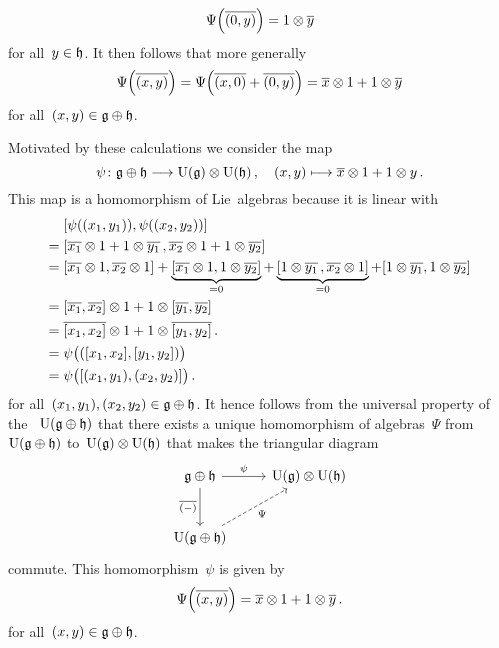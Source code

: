 \begin{example}
\begin{itemize}
      \[
        \Psi\Bigl( \overline{(0,y)} \Bigr)
        =
        1 \otimes \overline{y}
      \]
      for all~$y \in \mathfrak{h}$.
      It then follows that more generally
      \[
        \Psi\Bigl( \overline{(x,y)} \Bigr)
        =
        \Psi\Bigl( \overline{(x,0)} + \overline{(0,y)} \Bigr)
        =
        \overline{x} \otimes 1 + 1 \otimes \overline{y}
      \]
      for all~$(x,y) \in \mathfrak{g} \oplus \mathfrak{h}$.
      
      Motivated by these calculations we consider the map
      \[
        \psi
        \colon
        \glie \oplus \hlie
        \to
        \Univ(\glie) \tensor \Univ(\hlie) \,,
        \quad
        (x,y)
        \mapsto
        \class{x} \otimes 1 + 1 \otimes{y} \,.
      \]
      This map is a homomorphism of Lie~algebras because it is linear with
      \begin{align*}
        {}&
        [\psi((x_1, y_1)), \psi((x_2, y_2))]
        \\
        ={}&
        [
          \overline{x_1} \otimes 1 + 1 \otimes \overline{y_1} \,,
          \overline{x_2} \otimes 1 + 1 \otimes \overline{y_2}
        ]
        \\
        ={}&
          [\overline{x_1} \otimes 1, \overline{x_2} \otimes 1]
        + \underbrace{ [\overline{x_1} \otimes 1, 1 \otimes \overline{y_2}] }_{=0}
        + \underbrace{ [1 \otimes \overline{y_1} \,, \overline{x_2} \otimes 1] }_{=0}
        + [1 \otimes \overline{y_1}, 1 \otimes \overline{y_2}]
        \\
        ={}&
          [\overline{x_1}, \overline{x_2}] \otimes 1
        + 1 \otimes [\overline{y_1}, \overline{y_2}]
        \\
        ={}&
          \overline{[x_1, x_2]} \otimes 1
        + 1 \otimes \overline{[y_1, y_2]}  \,.
        \\
        ={}&
        \psi\bigl( ( [x_1, x_2], [y_1, y_2] ) \bigr)
        \\
        ={}&
        \psi\bigl( [(x_1, y_1), (x_2, y_2)] \bigr) \,.
      \end{align*}
      for all~$(x_1, y_1), (x_2, y_2) \in \mathfrak{g} \oplus \mathfrak{h}$.
      It hence follows from the universal property of the {\ua}~$\operatorname{U}(\mathfrak{g} \oplus \mathfrak{h})$ that there exists a unique homomorphism of algebras~$\Psi$ from~$\operatorname{U}(\mathfrak{g} \oplus \mathfrak{h})$ to~$\operatorname{U}(\mathfrak{g}) \otimes \operatorname{U}(\mathfrak{h})$ that makes the triangular diagram
      \[
        \begin{tikzcd}[row sep = large]
          \glie \oplus \hlie
          \arrow{r}[above]{\psi}
          \arrow{d}[left]{\class{(-)}}
          &
          \Univ(\glie) \tensor \Univ(\hlie)
          \\
          \Univ(\glie \oplus \hlie)
          \arrow[dashed]{ur}[below right]{\Psi}
          &
          {}
        \end{tikzcd}
      \]
      commute.
      This homomorphism~$\psi$ is given by
      \[
        \Psi\Bigl( \overline{(x,y)} \Bigr)
        =
        \overline{x} \otimes 1 + 1 \otimes \overline{y} \,.
      \]
      for all~$(x,y) \in \mathfrak{g} \oplus \mathfrak{h}$.
      

\end{itemize}
\end{example}
